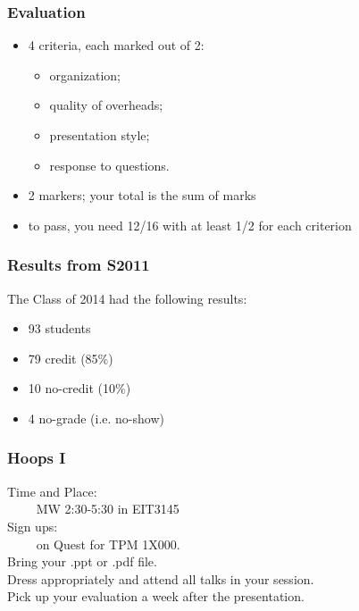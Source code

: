 \documentclass{beamer}
\begin{document}
\begin{frame}

\frametitle{Evaluation}

\begin{itemize}
\item 4 criteria, each marked out of 2:
\begin{itemize}
\item organization;
\item quality of overheads;
\item presentation style;
\item response to questions.
\end{itemize}
\item 2 markers; your total is the sum of marks
\item to pass, you need 12/16 with at least 1/2 for each criterion
\end{itemize}

\end{frame}

\begin{frame}

\frametitle{Results from S2011}

The Class of 2014 had the following results:

\begin{itemize}
\item 93 students\\[1em]

\item 79 credit (85\%)
\item 10 no-credit (10\%)
\item 4 no-grade (i.e. no-show)
\end{itemize}

\end{frame}

\begin{frame}

\frametitle{Hoops I}

Time and Place: \\
$\qquad$ MW 2:30-5:30 in EIT3145\\[2em]

Sign ups: \\
$\qquad$ on Quest for TPM 1X000.\\[2em]

Bring your .ppt or .pdf file.\\[1em]

Dress appropriately and attend all talks in your session.\\[1em]

Pick up your evaluation a week after the presentation.

\end{frame}
\end{document}
